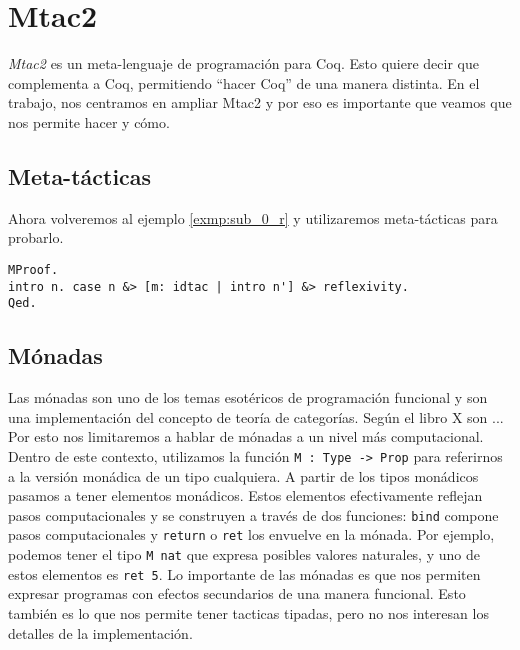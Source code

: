 \chapter{Mtac2}\label{ch:mtac2}

\textit{Mtac2} es un meta-lenguaje de programación para Coq. Esto quiere decir que complementa a Coq, permitiendo ``hacer Coq'' de una manera distinta. En el trabajo, nos centramos en ampliar Mtac2 y por eso es importante que veamos que nos permite hacer y cómo.

\section{Meta-tácticas}

Ahora volveremos al ejemplo \ref{exmp:sub_0_r} y utilizaremos meta-tácticas para probarlo.
\begin{exmp}\label{exmp:sub_0_r_mtac2}
\begin{lstlisting}
MProof.
intro n. case n &> [m: idtac | intro n'] &> reflexivity.
Qed.
\end{lstlisting}
\end{exmp}

\section{Mónadas}
Las mónadas son uno de los temas esotéricos de programación funcional y son una implementación del concepto de teoría de categorías. Según el libro X son ...
Por esto nos limitaremos a hablar de mónadas a un nivel más computacional. Dentro de este contexto, utilizamos la función \lstinline{M : Type -> Prop} para referirnos a la versión monádica de un tipo cualquiera. A partir de los tipos monádicos pasamos a tener elementos monádicos. Estos elementos efectivamente reflejan pasos computacionales y se construyen a través de dos funciones: \lstinline{bind} compone pasos computacionales y \lstinline{return} o \lstinline{ret} los envuelve en la mónada. Por ejemplo, podemos tener el tipo \lstinline{M nat} que expresa posibles valores naturales, y uno de estos elementos es \lstinline{ret 5}. Lo importante de las mónadas es que nos permiten expresar programas con efectos secundarios de una manera funcional.
Esto también es lo que nos permite tener tacticas tipadas, pero no nos interesan los detalles de la implementación.

